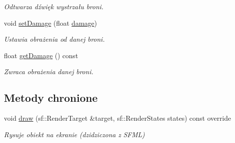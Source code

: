 \begin{DoxyCompactItemize}
\begin{DoxyCompactList}\small\item\em Odtwarza dźwięk wystrzału broni. \end{DoxyCompactList}\item 
void \mbox{\hyperlink{class_weapon_a00809195a729c5efc854a0fe6dda72aa}{set\+Damage}} (float \mbox{\hyperlink{class_weapon_a5fd71198c35ebc63e9d5c4fc486d2510}{damage}})
\begin{DoxyCompactList}\small\item\em Ustawia obrażenia od danej broni. \end{DoxyCompactList}\item 
float \mbox{\hyperlink{class_weapon_a35dc33e086bd053d95b10d4a7c83494c}{get\+Damage}} () const
\begin{DoxyCompactList}\small\item\em Zwraca obrażenia danej broni. \end{DoxyCompactList}\end{DoxyCompactItemize}
\subsection*{Metody chronione}
\begin{DoxyCompactItemize}
\item 
void \mbox{\hyperlink{class_weapon_ae0cdebb7e5fde5a913a390ff573001e2}{draw}} (sf\+::\+Render\+Target \&target, sf\+::\+Render\+States states) const override
\begin{DoxyCompactList}\small\item\em Rysuje obiekt na ekranie (dzidziczona z S\+F\+ML) \end{DoxyCompactList}\end{DoxyCompactItemize}

